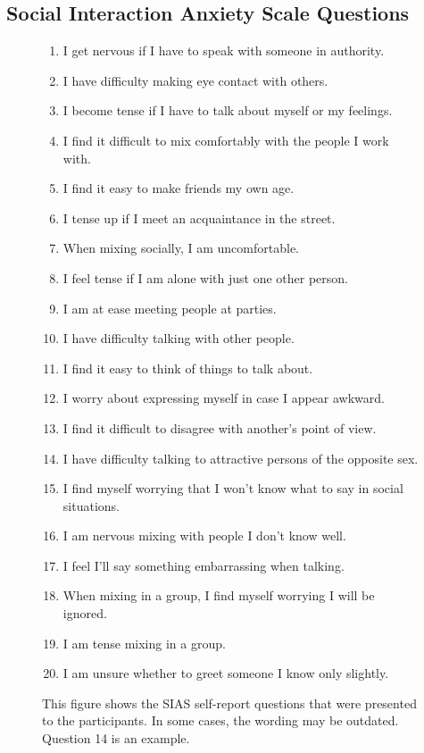 \documentclass{l4proj}
\begin{document}
\begin{appendices}
\chapter{Social Interaction Anxiety Scale Questions}

\begin{figure}[htb]
    \centering
    \begin{enumerate}
        \item I get nervous if I have to speak with someone in authority.
        \item I have difficulty making eye contact with others.
        \item I become tense if I have to talk about myself or my feelings.
        \item I find it difficult to mix comfortably with the people I work with.
        \item I find it easy to make friends my own age.
        \item I tense up if I meet an acquaintance in the street.
        \item When mixing socially, I am uncomfortable.
        \item I feel tense if I am alone with just one other person.
        \item I am at ease meeting people at parties.
        \item I have difficulty talking with other people.
        \item I find it easy to think of things to talk about.
        \item I worry about expressing myself in case I appear awkward.
        \item I find it difficult to disagree with another’s point of view.
        \item I have difficulty talking to attractive persons of the opposite sex.
        \item I find myself worrying that I won’t know what to say in social situations.
        \item I am nervous mixing with people I don’t know well.
        \item I feel I’ll say something embarrassing when talking.
        \item When mixing in a group, I find myself worrying I will be ignored.
        \item I am tense mixing in a group.
        \item I am unsure whether to greet someone I know only slightly.
    \end{enumerate}
    \caption{This figure shows the SIAS self-report questions that were presented to the participants. In some cases, the wording may be outdated. Question 14 is an example.}
    \label{fig:sias_questions} 
\end{figure}


\end{appendices}
\end{document}
